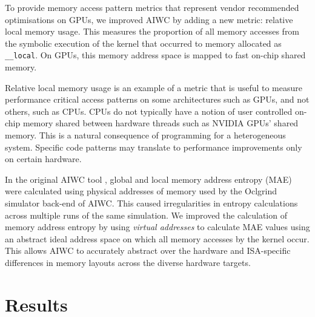 \documentclass[review=false, sigchi]{acmart}
\begin{document}
	To provide memory access pattern metrics that represent vendor recommended optimisations on GPUs, we improved AIWC by adding a new metric: relative local memory usage. This measures the proportion of all memory accesses from the symbolic execution of the kernel that occurred to memory allocated as \texttt{\_\_local}. On GPUs, this memory address space is mapped to fast on-chip shared memory.
	
	Relative local memory usage is an example of a metric that is useful to measure performance critical access patterns on some architectures such as GPUs, and not others, such as CPUs. CPUs do not typically have a notion of user controlled on-chip memory shared between hardware threads such as NVIDIA GPUs' shared memory. This is a natural consequence of programming for a heterogeneous system. Specific code patterns may translate to performance improvements only on certain hardware.
	
	In the original AIWC tool \cite{beau_johnston_2017_1134175}, global and local memory address entropy (MAE) were calculated using physical addresses of memory used by the Oclgrind simulator back-end of AIWC. This caused irregularities in entropy calculations across multiple runs of the same simulation. We improved the calculation of memory address entropy by using \textit{virtual addresses} to calculate MAE values using an abstract ideal address space on which all memory accesses by the kernel occur. This allows AIWC to accurately abstract over the hardware and ISA-specific differences in memory layouts across the diverse hardware targets.
		
	\section{Results} \label{results}
	
\end{document}

